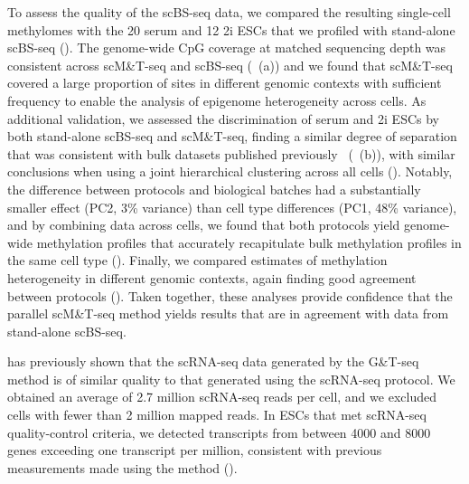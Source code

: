To assess the quality of the scBS-seq data, we compared the resulting single-cell methylomes with the 20 serum and 12 2i ESCs that we profiled with stand-alone scBS-seq (). The genome-wide CpG coverage at matched sequencing depth was consistent across scM\&T-seq and scBS-seq (~(a)) and we found that scM\&T-seq covered a large proportion of sites in different genomic contexts with sufficient frequency to enable the analysis of epigenome heterogeneity across cells. As additional validation, we assessed the discrimination of serum and 2i ESCs by both stand-alone scBS-seq and scM\&T-seq, finding a similar degree of separation that was consistent with bulk datasets published previously~\citep{ficz_fgf_2013} (~(b)), with similar conclusions when using a joint hierarchical clustering across all cells (). Notably, the difference between protocols and biological batches had a substantially smaller effect (PC2, 3\% variance) than cell type differences (PC1, 48\% variance), and by combining data across cells, we found that both protocols yield genome-wide methylation profiles that accurately recapitulate bulk methylation profiles in the same cell type (). Finally, we compared estimates of methylation heterogeneity in different genomic contexts, again finding good agreement between protocols (). Taken together, these analyses provide confidence that the parallel scM\&T-seq method yields results that are in agreement with data from stand-alone scBS-seq.

\citet{macaulay_g&t-seq:_2015} has previously shown that the scRNA-seq data generated by the G\&T-seq method is of similar quality to that generated using the scRNA-seq protocol. We obtained an average of 2.7 million scRNA-seq reads per cell, and we excluded cells with fewer than 2 million mapped reads. In ESCs that met scRNA-seq quality-control criteria, we detected transcripts from between 4000 and 8000 genes exceeding one transcript per million, consistent with previous measurements made using the method ().

